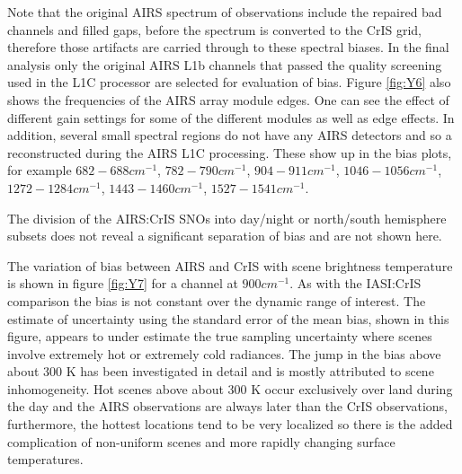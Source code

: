 \documentclass[twocolumn,10pt]{article}
\begin{document}
Note that the original AIRS spectrum of observations include the repaired bad channels and filled gaps, before the spectrum is converted to the CrIS grid, therefore those artifacts are carried through to these spectral biases. In the final analysis only the original AIRS L1b channels that passed the quality screening used in the L1C processor are selected for evaluation of bias. Figure \ref{fig:Y6} also shows the frequencies of the AIRS array module edges. One can see the effect of different gain settings for some of the different modules as well as edge effects. In addition, several small spectral regions do not have any AIRS detectors and so a reconstructed during the AIRS L1C processing. These show up in the bias plots, for example $ 682 - 688 cm^{-1} $, $ 782 - 790 cm^{-1} $, $ 904 - 911 cm^{-1} $, $ 1046 - 1056 cm^{-1} $, $ 1272 - 1284 cm^{-1} $, $ 1443 - 1460 cm^{-1} $, $ 1527 - 1541 cm^{-1} $.

The division of the AIRS:CrIS SNOs into day/night or north/south hemisphere subsets does not reveal a significant separation of bias and are not shown here.

The variation of bias between AIRS and CrIS with scene brightness temperature is shown in figure \ref{fig:Y7} for a channel at $ 900 cm^{-1} $. As with the IASI:CrIS comparison the bias is not constant over the dynamic range of interest. The estimate of uncertainty using the standard error of the mean bias, shown in this figure, appears to under estimate the true sampling uncertainty where scenes involve extremely hot or extremely cold radiances. The jump in the bias above about 300 K has been investigated in detail and is mostly attributed to scene inhomogeneity. Hot scenes above about 300 K occur exclusively over land during the day and the AIRS observations are always later than the CrIS observations, furthermore, the hottest locations tend to be very localized so there is the added complication of non-uniform scenes and more rapidly changing surface temperatures.
\end{document}
